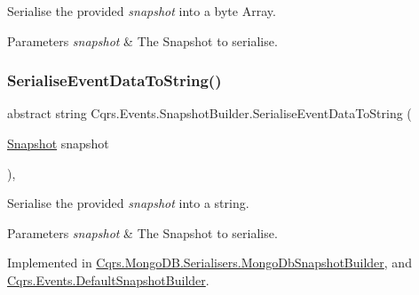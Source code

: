 Serialise the provided {\itshape snapshot}  into a byte Array. 


\begin{DoxyParams}{Parameters}
{\em snapshot} & The Snapshot to serialise.\\
\hline
\end{DoxyParams}
\mbox{\label{classCqrs_1_1Events_1_1SnapshotBuilder_a68fb9e6a5f6f78c01df6802a7f45387f_a68fb9e6a5f6f78c01df6802a7f45387f}} 
\subsubsection{\texorpdfstring{Serialise\+Event\+Data\+To\+String()}{SerialiseEventDataToString()}}
{\footnotesize\ttfamily abstract string Cqrs.\+Events.\+Snapshot\+Builder.\+Serialise\+Event\+Data\+To\+String (\begin{DoxyParamCaption}\item[{\hyperlink{classCqrs_1_1Snapshots_1_1Snapshot}{Snapshot}}]{snapshot }\end{DoxyParamCaption})\hspace{0.3cm}{\ttfamily [protected]}, {}}



Serialise the provided {\itshape snapshot}  into a string. 


\begin{DoxyParams}{Parameters}
{\em snapshot} & The Snapshot to serialise.\\
\hline
\end{DoxyParams}


Implemented in \hyperlink{classCqrs_1_1MongoDB_1_1Serialisers_1_1MongoDbSnapshotBuilder_a47770b61682197c725848255fc0e703f_a47770b61682197c725848255fc0e703f}{Cqrs.\+Mongo\+D\+B.\+Serialisers.\+Mongo\+Db\+Snapshot\+Builder}, and \hyperlink{classCqrs_1_1Events_1_1DefaultSnapshotBuilder_aa7a6bf5a1ba1ed176ecf12170645033e_aa7a6bf5a1ba1ed176ecf12170645033e}{Cqrs.\+Events.\+Default\+Snapshot\+Builder}.

